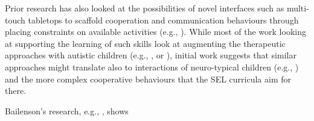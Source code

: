 \documentclass[prodmode,acmtochi]{acmsmall}
\begin{document}
Prior research has also looked at the possibilities of novel interfaces such as multi-touch tabletops to scaffold cooperation and communication behaviours through placing constraints on available activities (e.g., \cite{Yuill2012}). While most of the work looking at supporting the learning of such skills look at augmenting the therapeutic approaches with autistic children (e.g., \cite{Piper2006}, or \cite{Zarin2011}), initial work suggests that similar approaches might translate also to interactions of neuro-typical children (e.g., \cite{Hinske2009,Antle2013,Cao2010,Kharrufa2010}) and the more complex cooperative behaviours that the SEL curricula aim for there.  






\iffalse
                        \item Bailenson's research, e.g., \cite{Bailenson2005,Bailenson2008}, shows 
\end{document}
